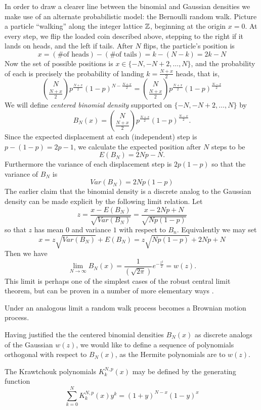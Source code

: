 In order to draw a clearer line between the binomial and Gaussian densities we make use of an alternate probabilistic model: the Bernoulli random walk. Picture a particle ``walking'' along the integer lattice $\mathbb{Z}$, beginning at the origin $x = 0$. At every step, we flip the loaded coin described above, stepping to the right if it lands on heads, and the left if tails. After $N$ flips, the particle's position is 
\[
  x = (\text{\# of heads}) - (\text{\# of tails}) = k - (N - k) = 2k - N
\]
Now the set of possible positions is $x \in \{-N, -N+2, \ldots, N\}$, and the probability of each is precisely the probability of landing $k = \frac{N + x}2$ heads, that is,
\[
  \binom{N}{\frac{N + x}2}p^{\frac{N + x}2}(1 - p)^{N - \frac{N + x}2}
  = \binom{N}{\frac{N + x}2}p^{\frac{N + x}2}(1 - p)^{\frac{N - x}2}
\]
We will define \emph{centered binomial density} supported on $\{-N, -N+2, \ldots, N\}$ by
\[
  B_N(x) = \binom{N}{\frac{N+x}2}p^{\frac{N+x}2}(1-p)^{\frac{N-x}2}.
\]
Since the expected displacement at each (independent) step is $p - (1 - p) = 2p - 1$, we calculate the expected position after $N$ steps to be 
\[
  E(B_N) = 2Np-N.
\]
Furthermore the variance of each displacement step is $2p(1-p)$ so that the variance of $B_N$ is
\[
  Var(B_N) = 2Np(1-p)
\]
The earlier claim that the binomial density is a discrete analog to the Gaussian density can be made explicit by the following limit relation. Let \[
  z = \frac{x - E(B_N)}{\sqrt{Var(B_N)}} 
  = \frac{x - 2Np + N}{\sqrt{Np(1-p)}}
\]
so that $z$ has mean $0$ and variance $1$ with respect to $B_n$. Equivalently we may set
\[
  x = z\sqrt{Var(B_N)} + E(B_N) = z \sqrt{Np(1-p)} + 2Np + N
\]
Then we have
\[
  \lim_{N \rightarrow \infty} B_N(x) = \frac{1}{(\sqrt{2\pi})}e^{-\frac{z^2}2} = w(z).
\]
This limit is perhaps one of the simplest cases of the robust central limit theorem, but can be proven in a number of more elementary ways \cn.

\begin{remark}
  Under an analogous limit a random walk process becomes a Brownian motion process. \cn
\end{remark}

Having justified the the centered binomial densities $B_N(x)$ as discrete analogs of the Gaussian $w(z)$, we would like to define a sequence of polynomials orthogonal with respect to $B_N(x)$, as the Hermite polynomials are to $w(z)$.

\begin{definition}
  The Krawtchouk polynomials $K_k^{N,p}(x)$ may be defined by the generating function
  \[
    \sum_{k=0}^N K^{N,p}_k(x)y^k = (1 + y)^{N - x}(1 - y)^x
  \]
\end{definition}

